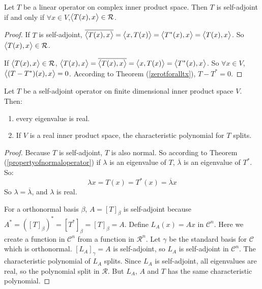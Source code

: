 \begin{theorem}
    Let $T$ be a linear operator on complex inner product space. Then $T$ is self-adjoint if and only if $\forall x \in V$,$\left\langle \displaystyle T(x), x \right\rangle \in \mathcal{R}$.
\end{theorem}
\begin{proof}
    If $T$ is self-adjoint, $\overline{\left\langle \displaystyle T(x), x \right\rangle} = \left\langle \displaystyle x, T(x) \right\rangle = \left\langle \displaystyle T^*(x), x \right\rangle = \left\langle \displaystyle T(x), x \right\rangle$. So $\left\langle \displaystyle T(x), x \right\rangle \in \mathcal{R}$.
    
    If $\left\langle \displaystyle T(x), x \right\rangle \in \mathcal{R}$, $\left\langle \displaystyle T(x), x \right\rangle = \overline{\left\langle \displaystyle T(x), x \right\rangle} = \left\langle \displaystyle x, T(x) \right\rangle = \left\langle \displaystyle T^*(x), x \right\rangle$. So $\forall x \in V$, $\left\langle \displaystyle (T - T^*)(x), x \right\rangle = 0$. According to Theorem (\ref{zerotforalltx}), $T - T^* = 0$.
\end{proof}


\begin{theorem}
    Let $T$ be a self-adjoint operator on finite dimensional inner product space $V$. Then:
    \begin{enumerate}
        \item every eigenvalue is real.
        \item If $V$ is a real inner product space, the characteristic polynomial for $T$ splits.
    \end{enumerate}
\end{theorem}
\begin{proof}
    Because $T$ is self-adjoint, $T$ is also normal. So according to Theorem (\ref{propertyofnormaloperator}) if $\lambda$ is an eigenvalue of $T$,  $\overline{\lambda}$ is an eigenvalue of $T^*$. So:
    \begin{equation*}
        \lambda x = T(x) = T^*(x) = \overline{\lambda} x
    \end{equation*}
    So $\lambda = \overline{\lambda}$, and $\lambda$ is real.
    
    For a orthonormal basis $\beta$, $A = [T]_\beta$ is self-adjoint because $A^* = ([T]_\beta)^* = [T^*]_\beta = [T]_\beta = A$. Define $L_A(x) = Ax$ in $\mathcal{C}^n$. Here we create a function in $\mathcal{C}^n$ from a function in $\mathcal{R}^n$. Let $\gamma$ be the standard basis for $\mathcal{C}$ which is orthonormal. $[L_A]_\gamma = A$ is self-adjoint, so $L_A$ is self-adjoint in $\mathcal{C}^n$. The characteristic polynomial of $L_A$ splits. Since $L_A$ is self-adjoint, all eigenvalues are real, so the polynomial split in $\mathcal{R}$. But $L_A$, $A$ and $T$ has the same characteristic polynomial.
\end{proof}

